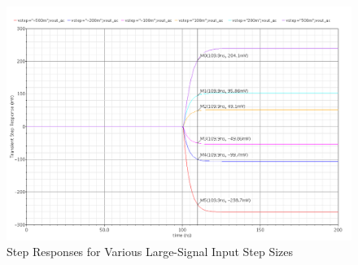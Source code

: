 \documentclass{article}
\begin{document}
\begin{figure}[H]
\centering
\includegraphics[width=5.5in]{bullet13_step.png}
\caption{Step Responses for Various Large-Signal Input Step Sizes}
\label{b13_step}
\end{figure}
\end{document}
